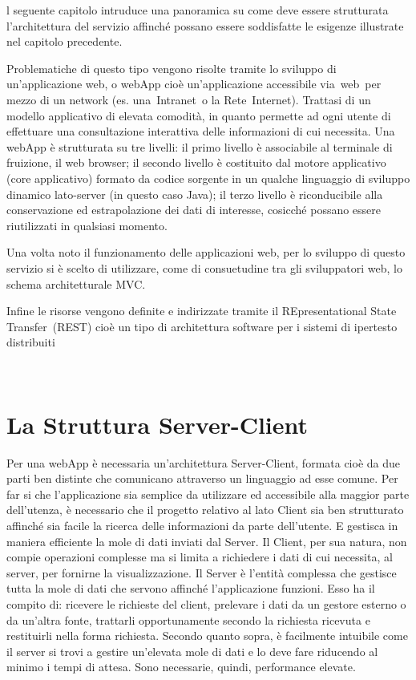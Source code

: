 l seguente capitolo intruduce una panoramica su come deve essere strutturata l’architettura del servizio affinché possano essere soddisfatte le esigenze illustrate nel capitolo precedente.

Problematiche di questo tipo vengono risolte tramite lo sviluppo di un’applicazione web, o webApp cioè un'applicazione accessibile via web per mezzo di un network (es. una Intranet o la Rete Internet). Trattasi di un modello applicativo di elevata comodità, in quanto permette ad ogni utente di effettuare una consultazione interattiva delle informazioni di cui necessita.
Una webApp è strutturata su tre livelli: il primo livello è associabile al terminale di fruizione, il web browser; il secondo livello è costituito dal motore applicativo (core applicativo)  formato da codice sorgente in un qualche linguaggio di sviluppo dinamico lato-server (in questo caso Java); il terzo livello è riconducibile alla conservazione ed estrapolazione dei dati di interesse, cosicché possano essere riutilizzati in qualsiasi momento.

Una volta noto il funzionamento delle applicazioni web, per lo sviluppo di questo servizio si è scelto di utilizzare, come di consuetudine tra gli sviluppatori web, lo schema architetturale MVC.

Infine le risorse vengono definite e indirizzate tramite il REpresentational State Transfer (REST) cioè un tipo di architettura software per i sistemi di ipertesto distribuiti

 \section{La Struttura Server-Client} %
\label{sec:la_struttura_server_client}



Per una webApp è necessaria un’architettura Server-Client, formata cioè da due parti ben distinte che comunicano attraverso un linguaggio ad esse comune.
Per far si che l’applicazione sia semplice da utilizzare ed accessibile alla maggior parte dell’utenza, è necessario che il progetto relativo al lato Client sia ben strutturato affinché sia facile la ricerca delle informazioni da parte dell’utente. E gestisca in maniera efficiente la mole di dati inviati dal Server.
Il Client, per sua natura, non compie operazioni complesse ma si limita a richiedere i dati di cui necessita, al server, per fornirne la visualizzazione. 
Il Server è l’entità complessa che gestisce tutta la mole di dati che servono affinché l’applicazione funzioni. Esso ha il compito di: ricevere le richieste del client, prelevare i dati da un gestore esterno o da un’altra fonte, trattarli opportunamente secondo la richiesta ricevuta e restituirli nella forma richiesta.
Secondo quanto sopra, è facilmente intuibile come il server si trovi a gestire un’elevata mole di dati e lo deve fare riducendo al minimo i tempi di attesa. Sono necessarie, quindi, performance elevate.

